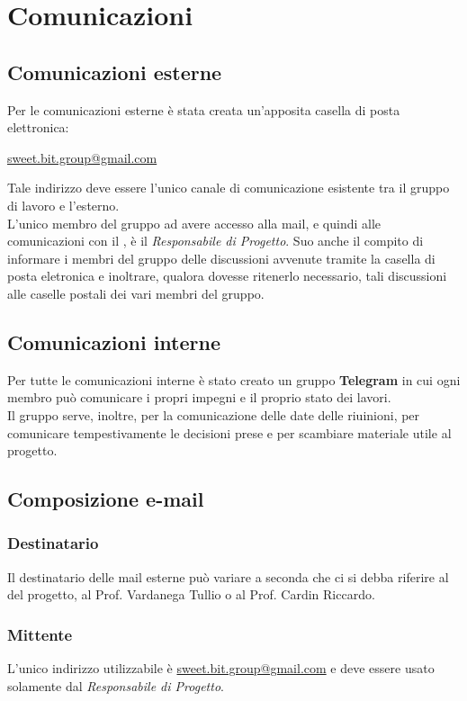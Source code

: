 \section{Comunicazioni}
  \subsection{Comunicazioni esterne}
    Per le comunicazioni esterne è stata creata un'apposita casella di posta elettronica:\\
      \begin{center}
        \href{mailto:sweet.bit.group@gmail.com}{sweet.bit.group@gmail.com}
      \end{center}
    Tale indirizzo deve essere l’unico canale di comunicazione esistente tra il gruppo di lavoro e l’esterno.\\
    L'unico membro del gruppo ad avere accesso alla mail, e quindi alle comunicazioni con il , è il \emph{Responsabile di Progetto}.
    Suo anche il compito di informare i membri del gruppo delle discussioni avvenute tramite la casella di posta eletronica e inoltrare, qualora dovesse ritenerlo necessario,
    tali discussioni alle caselle postali dei vari membri del gruppo.
  \subsection{Comunicazioni interne}
    Per tutte le comunicazioni interne è stato creato un gruppo \textbf{Telegram} in cui ogni membro può comunicare i propri impegni e il proprio stato dei lavori.\\
    Il gruppo serve, inoltre, per la comunicazione delle date delle riuinioni, per comunicare tempestivamente le decisioni prese e per scambiare materiale utile al progetto.
  \subsection{Composizione e-mail}
    \subsubsection{Destinatario}
      Il destinatario delle mail esterne può variare a seconda che ci si debba riferire al  del progetto, al Prof. Vardanega Tullio o al Prof. Cardin Riccardo.
    \subsubsection{Mittente}
      L’unico indirizzo utilizzabile è \href{mailto:sweet.bit.group@gmail.com}{sweet.bit.group@gmail.com} e deve essere usato solamente dal \emph{Responsabile di Progetto}.
